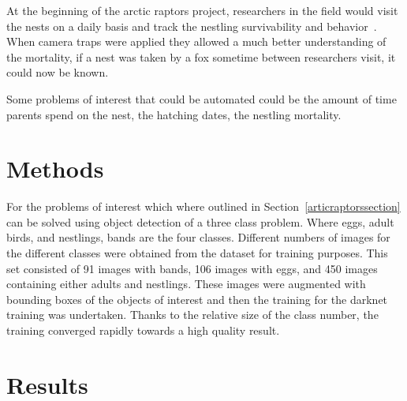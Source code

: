\documentclass[journal]{IEEEtran}
\begin{document}
At the beginning of the arctic raptors project, researchers in the field would visit the nests on a daily basis and track the nestling survivability and behavior~\cite{}. When camera traps were applied they allowed a much better understanding of the mortality, if a nest was taken by a fox sometime between researchers visit, it could now be known. 

Some problems of interest that could be automated could be the amount of time parents spend on the nest, the hatching dates, the nestling mortality. 


\section{Methods}\label{section:procedure}
For the problems of interest which where outlined in Section~\ref{articraptorssection} can be solved using object detection of a three class problem. Where eggs, adult birds, and nestlings, bands are the four classes. Different numbers of images for the different classes were obtained from the dataset for training purposes. This set consisted of 91 images with bands, 106 images with eggs, and 450 images containing either adults and nestlings. These images were augmented with bounding boxes of the objects of interest and then the training for the darknet training was undertaken. Thanks to the relative size of the class number, the training converged rapidly towards a high quality result. 

\section{Results}\label{section:results}
\end{document}
